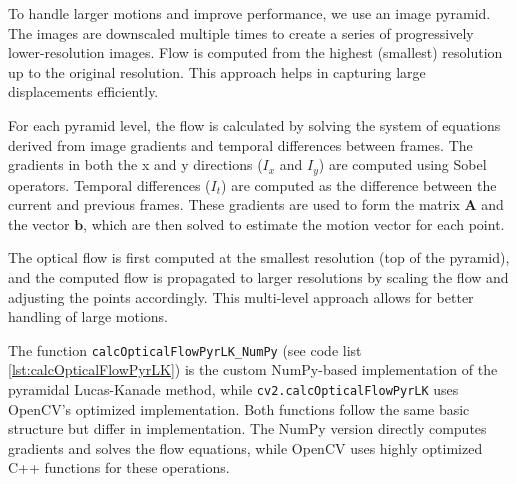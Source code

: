 \documentclass[11pt, conference, letterpaper]{IEEEtran}
\begin{document}
To handle larger motions and improve performance, we use an image pyramid. The images are downscaled multiple times to create a series of progressively lower-resolution images. Flow is computed from the highest (smallest) resolution up to the original resolution. This approach helps in capturing large displacements efficiently.

For each pyramid level, the flow is calculated by solving the system of equations derived from image gradients and temporal differences between frames. The gradients in both the x and y directions (\(I_x\) and \(I_y\)) are computed using Sobel operators. Temporal differences (\(I_t\)) are computed as the difference between the current and previous frames. These gradients are used to form the matrix \(\mathbf{A}\) and the vector \(\mathbf{b}\), which are then solved to estimate the motion vector for each point.

The optical flow is first computed at the smallest resolution (top of the pyramid), and the computed flow is propagated to larger resolutions by scaling the flow and adjusting the points accordingly. This multi-level approach allows for better handling of large motions.

The function \texttt{calcOpticalFlowPyrLK\_NumPy} (see code list \ref{lst:calcOpticalFlowPyrLK}) is the custom NumPy-based implementation of the pyramidal Lucas-Kanade method, while \texttt{cv2.calcOpticalFlowPyrLK} uses OpenCV's optimized implementation. Both functions follow the same basic structure but differ in implementation. The NumPy version directly computes gradients and solves the flow equations, while OpenCV uses highly optimized C++ functions for these operations.
\end{document}
